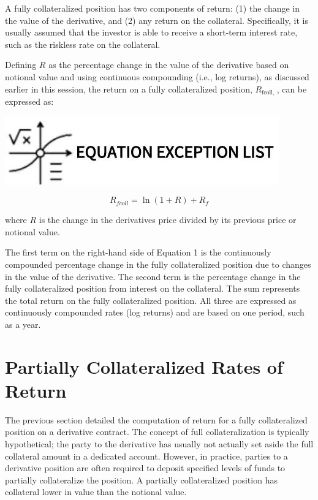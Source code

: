 \documentclass[11pt]{article}
\begin{document}
A fully collateralized position has two components of return: (1) the change in the value of the derivative, and (2) any return on the collateral. Specifically, it is usually assumed that the investor is able to receive a short-term interest rate, such as the riskless rate on the collateral.

Defining $R$ as the percentage change in the value of the derivative based on notional value and using continuous compounding (i.e., log returns), as discussed earlier in this session, the return on a fully collateralized position, $R_{\text {fcoll, }}$, can be expressed as:

\begin{center}
\includegraphics[max width=\textwidth]{2024_04_10_f0d77240f9276027738dg-2}
\end{center}


\begin{equation*}
R_{f c o l l}=\ln (1+R)+R_{f} \tag{1}
\end{equation*}


where $R$ is the change in the derivatives price divided by its previous price or notional value.

The first term on the right-hand side of Equation 1 is the continuously compounded percentage change in the fully collateralized position due to changes in the value of the derivative. The second term is the percentage change in the fully collateralized position from interest on the collateral. The sum represents the total return on the fully collateralized position. All three are expressed as continuously compounded rates (log returns) and are based on one period, such as a year.

\section*{Partially Collateralized Rates of Return}
The previous section detailed the computation of return for a fully collateralized position on a derivative contract. The concept of full collateralization is typically hypothetical; the party to the derivative has usually not actually set aside the full collateral amount in a dedicated account. However, in practice, parties to a derivative position are often required to deposit specified levels of funds to partially collateralize the position. A partially collateralized position has collateral lower in value than the notional value.
\end{document}
